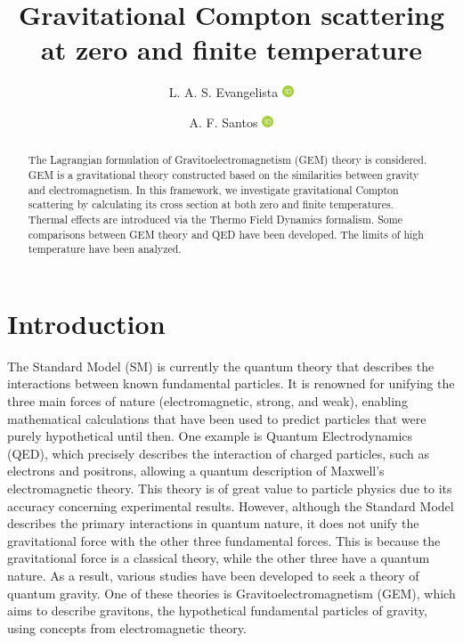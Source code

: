 \documentclass[11pt,showpacs,preprintnumbers,amsmath,amssymb,prd,nofootinbib,superscriptaddress]{revtex4-2}
\newcommand{\orcid}[1]{\href{https://orcid.org/#1}{\includegraphics[width=10pt]{orcid}}}
\begin{document}
\title{Gravitational Compton scattering at zero and finite temperature}

\author{L. A. S. Evangelista \orcid{0009-0002-3136-2234}}

\author{A. F. Santos \orcid{0000-0002-2505-5273}}




\begin{abstract}

The Lagrangian formulation of Gravitoelectromagnetism (GEM) theory is considered. GEM is a gravitational theory constructed based on the similarities between gravity and electromagnetism. In this framework, we investigate gravitational Compton scattering by calculating its cross section at both zero and finite temperatures. Thermal effects are introduced via the Thermo Field Dynamics formalism. Some comparisons between GEM theory and QED have been developed. The limits of high temperature have been analyzed.

\end{abstract}


\maketitle

\section{Introduction}


The Standard Model (SM) is currently the quantum theory that describes the interactions between known fundamental particles. It is renowned for unifying the three main forces of nature (electromagnetic, strong, and weak), enabling mathematical calculations that have been used to predict particles that were purely hypothetical until then. One example is Quantum Electrodynamics (QED), which precisely describes the interaction of charged particles, such as electrons and positrons, allowing a quantum description of Maxwell's electromagnetic theory. This theory is of great value to particle physics due to its accuracy concerning experimental results. However, although the Standard Model describes the primary interactions in quantum nature, it does not unify the gravitational force with the other three fundamental forces. This is because the gravitational force is a classical theory, while the other three have a quantum nature. As a result, various studies have been developed to seek a theory of quantum gravity. One of these theories is Gravitoelectromagnetism (GEM), which aims to describe gravitons, the hypothetical fundamental particles of gravity, using concepts from electromagnetic theory.
\end{document}
